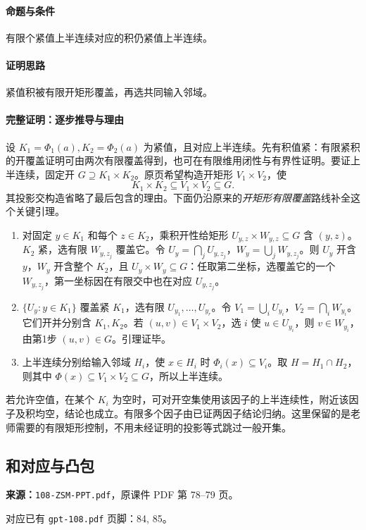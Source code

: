 \paragraph{命题与条件}有限个紧值上半连续对应的积仍紧值上半连续。
\paragraph{证明思路}紧值积被有限开矩形覆盖，再选共同输入邻域。
\paragraph{完整证明：逐步推导与理由}

设 $K_1=\Phi_1(a),K_2=\Phi_2(a)$ 为紧值，且对应上半连续。先有积值紧：有限紧积的开覆盖证明可由两次有限覆盖得到，也可在有限维用闭性与有界性证明。要证上半连续，固定开 $G\supseteq K_1\times K_2$。原页希望构造开矩形 $V_1\times V_2$，使
\[K_1\times K_2\subseteq V_1\times V_2\subseteq G.\]
其投影交构造省略了最后包含的理由。下面仍沿原来的\emph{开矩形有限覆盖}路线补全这个关键引理。
\begin{enumerate}
\item 对固定 $y\in K_1$ 和每个 $z\in K_2$，乘积开性给矩形 $U_{y,z}\times W_{y,z}\subseteq G$ 含 $(y,z)$。$K_2$ 紧，选有限 $W_{y,z_j}$ 覆盖它。令 $U_y=\bigcap_jU_{y,z_j}$，$W_y=\bigcup_jW_{y,z_j}$。则 $U_y$ 开含 $y$，$W_y$ 开含整个 $K_2$，且 $U_y\times W_y\subseteq G$：任取第二坐标，选覆盖它的一个 $W_{y,z_j}$，第一坐标因在有限交中也在对应 $U_{y,z_j}$。
\item $\{U_y:y\in K_1\}$ 覆盖紧 $K_1$，选有限 $U_{y_1},\ldots,U_{y_r}$。令 $V_1=\bigcup_iU_{y_i}$，$V_2=\bigcap_iW_{y_i}$。它们开并分别含 $K_1,K_2$。若 $(u,v)\in V_1\times V_2$，选 $i$ 使 $u\in U_{y_i}$，则 $v\in W_{y_i}$，由第1步 $(u,v)\in G$。引理证毕。
\item 上半连续分别给输入邻域 $H_i$，使 $x\in H_i$ 时 $\Phi_i(x)\subseteq V_i$。取 $H=H_1\cap H_2$，则其中 $\Phi(x)\subseteq V_1\times V_2\subseteq G$，所以上半连续。
\end{enumerate}
若允许空值，在某个 $K_i$ 为空时，可对开空集使用该因子的上半连续性，附近该因子及积均空，结论也成立。有限多个因子由已证两因子结论归纳。这里保留的是老师需要的有限矩形控制，不用未经证明的投影等式跳过一般开集。

\clearpage\subsection{和对应与凸包}
\textbf{来源：}\texttt{108-ZSM-PPT.pdf}，原课件 PDF 第 78--79 页。\par
对应已有 \texttt{gpt-108.pdf} 页脚：84, 85。\par
